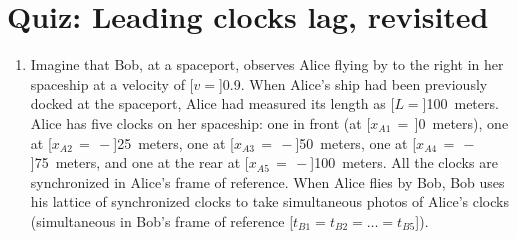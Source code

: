\documentclass[pagesize,headsepline,10pt,parskip=half]{scrreprt}
\newcommand{\const}[1]{\mathrm{#1}}
\renewcommand{\c}{\const{c}}
\begin{document}
  \section{Quiz: Leading clocks lag, revisited}
    \begin{samepage}
      \begin{enumerate}
        \item
          Imagine that Bob, at a spaceport, observes Alice flying by to the right
          in her spaceship at a velocity of [$v = $]\SI{0.9}{\c}. When Alice’s ship
          had been previously docked at the spaceport, Alice had measured its length as
          [$L = $]100~meters.  Alice has five clocks on her spaceship: one in front
          (at [$x_{A1}\,=\,$]0~meters), one at [$x_{A2}\,=\,-$]25~meters, one at
          [$x_{A3}\,=\,-$]50~meters, one at [$x_{A4}\,=\,-$]75~meters, and one at
          the rear at [$x_{A5}\,=\,-$]100~meters. All the clocks are synchronized in
          Alice’s frame of reference.  When Alice flies by Bob, Bob uses his
          lattice of synchronized clocks to take simultaneous photos of Alice’s
          clocks (simultaneous in Bob’s frame of reference
          [$t_{B1} = t_{B2} = \dots = t_{B5}$]).


\end{enumerate}
\end{samepage}
\end{document}
